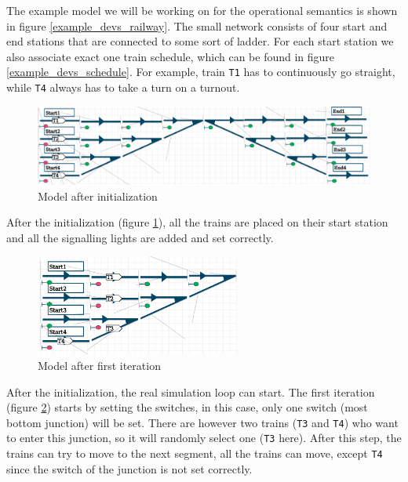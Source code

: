 \documentclass{article}
\begin{document}
The example model we will be working on for the operational semantics is shown in figure \ref{example_devs_railway}. The small network consists of four start and end stations that are connected to some sort of ladder. For each start station we also associate exact one train schedule, which can be found in figure \ref{example_devs_schedule}. For example, train \texttt{T1} has to continuously go straight, while \texttt{T4} always has to take a turn on a turnout.

\begin{figure}[H]
    \centering
    \includegraphics[width=\textwidth]{images/example_devs_after_init.png}
    \caption{Model after initialization}
    \label{example_devs_after_init}
\end{figure}

After the initialization (figure \ref{example_devs_after_init}), all the trains are placed on their start station and all the signalling lights are added and set correctly.


\begin{figure}[H]
    \centering
    \includegraphics[width=0.6\textwidth]{images/example_devs_after_first_iter.png}
    \caption{Model after first iteration}
    \label{example_devs_after_first_iter}
\end{figure}

After the initialization, the real simulation loop can start. The first iteration (figure \ref{example_devs_after_first_iter}) starts by setting the switches, in this case, only one switch (most bottom junction) will be set. There are however two trains (\texttt{T3} and \texttt{T4}) who want to enter this junction, so it will randomly select one (\texttt{T3} here). After this step, the trains can try to move to the next segment, all the trains can move, except \texttt{T4} since the switch of the junction is not set correctly.
\end{document}
